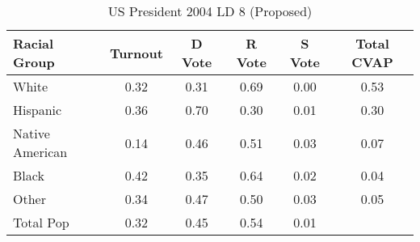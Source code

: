 \begin{table}[htb]
\begin{center}
\caption{US President 2004 LD 8 (Proposed)}
\label{pres04_cvap_ld_8}
\begin{tabular}{lccccc}
  \hline
Racial Group & Turnout & D Vote & R Vote & S Vote & Total CVAP \\ 
  \hline
White & 0.32 & 0.31 & 0.69 & 0.00 & 0.53 \\ 
  Hispanic & 0.36 & 0.70 & 0.30 & 0.01 & 0.30 \\ 
  Native American & 0.14 & 0.46 & 0.51 & 0.03 & 0.07 \\ 
  Black & 0.42 & 0.35 & 0.64 & 0.02 & 0.04 \\ 
  Other & 0.34 & 0.47 & 0.50 & 0.03 & 0.05 \\ 
  Total Pop & 0.32 & 0.45 & 0.54 & 0.01 &  \\ 
   \hline
\end{tabular}
\end{center}
\end{table}
